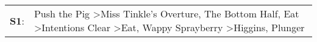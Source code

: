 \begin{supertabular}{p{0.03\textwidth}p{0.92\textwidth}}
 \textbf{S1}:  &  Push the Pig\textsuperscript{} \textgreater \enspace Miss Tinkle's Overture\textsuperscript{}, \enspace The Bottom Half\textsuperscript{}, \enspace Eat\textsuperscript{} \textgreater \enspace Intentions Clear\textsuperscript{} \textgreater \enspace Eat\textsuperscript{}, \enspace Wappy Sprayberry\textsuperscript{} \textgreater \enspace Higgins\textsuperscript{}, \enspace Plunger\textsuperscript{}  \enspace  \\
\end{supertabular}
